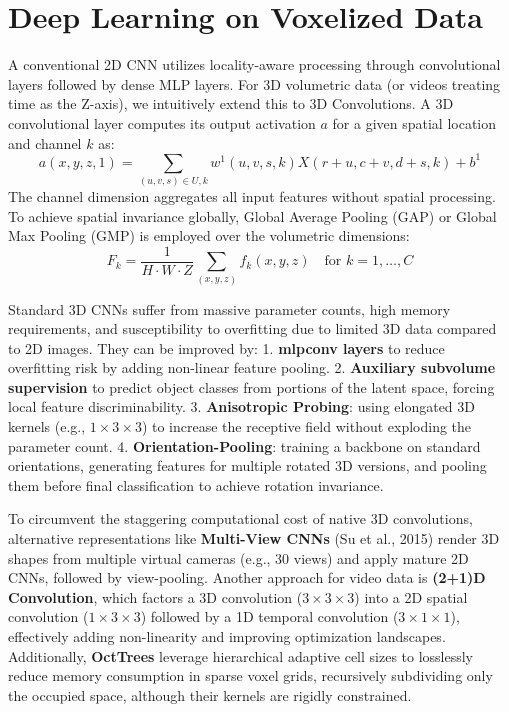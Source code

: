 \section{Deep Learning on Voxelized Data}

A conventional 2D CNN utilizes locality-aware processing through convolutional layers followed by dense MLP layers. For 3D volumetric data (or videos treating time as the Z-axis), we intuitively extend this to 3D Convolutions. A 3D convolutional layer computes its output activation $a$ for a given spatial location and channel $k$ as:
\begin{equation}
a(x, y, z, 1) = \sum_{(u, v, s) \in U, k} w^1(u, v, s, k) X(r+u, c+v, d+s, k) + b^1
\end{equation}
The channel dimension aggregates all input features without spatial processing. To achieve spatial invariance globally, Global Average Pooling (GAP) or Global Max Pooling (GMP) is employed over the volumetric dimensions:
\begin{equation}
F_k = \frac{1}{H \cdot W \cdot Z} \sum_{(x,y,z)} f_k(x, y, z) \quad \text{for } k=1,\dots,C
\end{equation}

\begin{insightbox}
Standard 3D CNNs suffer from massive parameter counts, high memory requirements, and susceptibility to overfitting due to limited 3D data compared to 2D images. They can be improved by:
1. \textbf{mlpconv layers} to reduce overfitting risk by adding non-linear feature pooling.
2. \textbf{Auxiliary subvolume supervision} to predict object classes from portions of the latent space, forcing local feature discriminability.
3. \textbf{Anisotropic Probing}: using elongated 3D kernels (e.g., $1 \times 3 \times 3$) to increase the receptive field without exploding the parameter count.
4. \textbf{Orientation-Pooling}: training a backbone on standard orientations, generating features for multiple rotated 3D versions, and pooling them before final classification to achieve rotation invariance.
\end{insightbox}

To circumvent the staggering computational cost of native 3D convolutions, alternative representations like \textbf{Multi-View CNNs} (Su et al., 2015) render 3D shapes from multiple virtual cameras (e.g., 30 views) and apply mature 2D CNNs, followed by view-pooling. Another approach for video data is \textbf{(2+1)D Convolution}, which factors a 3D convolution ($3 \times 3 \times 3$) into a 2D spatial convolution ($1 \times 3 \times 3$) followed by a 1D temporal convolution ($3 \times 1 \times 1$), effectively adding non-linearity and improving optimization landscapes. Additionally, \textbf{OctTrees} leverage hierarchical adaptive cell sizes to losslessly reduce memory consumption in sparse voxel grids, recursively subdividing only the occupied space, although their kernels are rigidly constrained.

